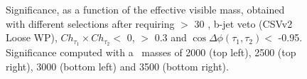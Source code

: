 \begin{figure}[ht]
\begin{center}
{}
\caption{Significance, as a function of the effective visible mass, obtained 
with different selections after requiring \MET $>$ 30 \GeV, b-jet veto (CSVv2 Loose WP),
$Ch_{\tau_{1}} \times Ch_{\tau_{2}} <$ 0, \DRt $>$ 0.3 and 
$\cos\Delta \phi (\tau_{1},\tau_{2}) <$ -0.95. Significance computed 
with a \Zprime~masses of 2000 \GeV (top left), 2500 \GeV (top right),
3000 \GeV (bottom left) and 3500 \GeV (bottom right). \label{fig:EventSelection}}
\end{center}
\end{figure}